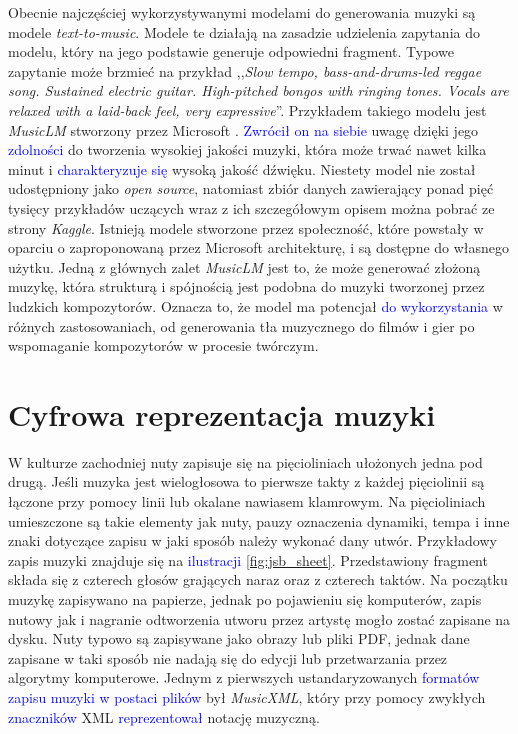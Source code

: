 \documentclass[data-science]{agh-wi} %
\begin{document}
Obecnie najczęściej wykorzystywanymi modelami do generowania muzyki są modele \textit{text-to-music}. Modele te działają na zasadzie udzielenia zapytania do modelu, który na jego podstawie generuje odpowiedni fragment. Typowe zapytanie może brzmieć na przykład ,,\textit{Slow tempo, bass-and-drums-led reggae song. Sustained electric guitar. High-pitched bongos with ringing tones. Vocals are relaxed with a laid-back feel, very expressive}''. Przykładem takiego modelu jest \textit{MusicLM} stworzony przez Microsoft \cite*{agostinelli2023musiclm}. \textcolor{blue}{Zwrócił on na siebie} uwagę dzięki jego \textcolor{blue}{zdolności} do tworzenia wysokiej jakości muzyki, która może trwać nawet kilka minut i \textcolor{blue}{charakteryzuje się} wysoką jakość dźwięku. Niestety model nie został udostępniony jako \textit{open source}, natomiast zbiór danych zawierający ponad pięć tysięcy przykładów uczących wraz z ich szczegółowym opisem można pobrać ze strony \textit{Kaggle}. Istnieją modele stworzone przez społeczność, które powstały w oparciu o zaproponowaną przez Microsoft architekturę, i są dostępne do własnego użytku. Jedną z głównych zalet \textit{MusicLM} jest to, że może generować złożoną muzykę, która strukturą i spójnością jest podobna do muzyki tworzonej przez ludzkich kompozytorów. Oznacza to, że model ma potencjał \textcolor{blue}{do wykorzystania} w różnych zastosowaniach, od generowania tła muzycznego do filmów i gier po wspomaganie kompozytorów w procesie twórczym.


\section{Cyfrowa reprezentacja muzyki}\label{sec:muzyka_cyfrowa}
W kulturze zachodniej nuty zapisuje się na pięcioliniach ułożonych jedna pod drugą. Jeśli muzyka jest wielogłosowa to pierwsze takty z każdej pięciolinii są łączone przy pomocy linii lub okalane nawiasem klamrowym. Na pięcioliniach umieszczone są takie elementy jak nuty, pauzy oznaczenia dynamiki, tempa i inne znaki dotyczące zapisu w jaki sposób należy wykonać dany utwór. Przykładowy zapis muzyki znajduje się na \textcolor{blue}{ilustracji} \ref*{fig:jsb_sheet}. Przedstawiony fragment składa się z czterech głosów grających naraz oraz z czterech taktów. Na początku muzykę zapisywano na papierze, jednak po pojawieniu się komputerów, zapis nutowy jak i nagranie odtworzenia utworu przez artystę mogło zostać zapisane na dysku. Nuty typowo są zapisywane jako obrazy lub pliki PDF, jednak dane zapisane w taki sposób nie nadają się do edycji lub przetwarzania przez algorytmy komputerowe. Jednym z pierwszych ustandaryzowanych \textcolor{blue}{formatów zapisu muzyki w postaci plików} był \textit{MusicXML}, który przy pomocy zwykłych \textcolor{blue}{znaczników} XML \textcolor{blue}{reprezentował} notację muzyczną.
\end{document}
